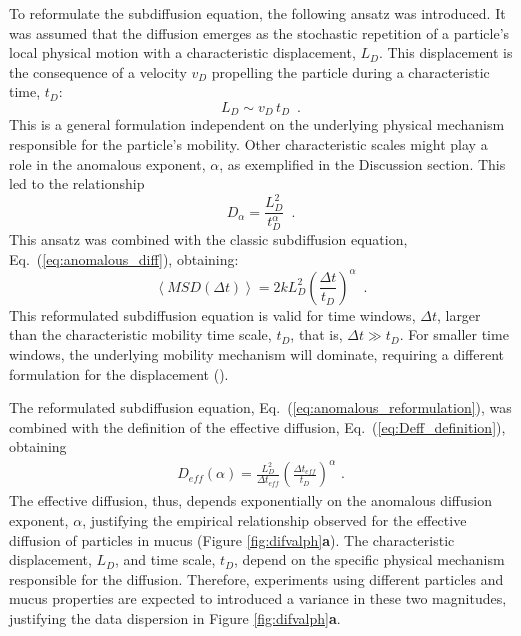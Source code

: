 \documentclass[aps,prl,preprint,superscriptaddress,showkeys,linenumbers]{revtex4-1}
\begin{document}
To reformulate the subdiffusion equation, the following ansatz was introduced. It was assumed that the diffusion emerges as the stochastic repetition of a particle's local physical motion with a characteristic displacement, $L_D$. This displacement is the consequence of a velocity $v_D$ propelling the particle during a characteristic time, $t_D$:
\begin{equation}
L_D \sim v_D \, t_D \,\,\,.
\label{eq:L_D_ansatz}
\end{equation}
This is a general formulation independent on the underlying physical mechanism responsible for the particle's mobility. Other characteristic scales might play a role in the anomalous exponent, $\alpha$, as exemplified in the Discussion section. This led to the relationship
\begin{equation}
D_{\alpha} = \frac{L_D^2}{t_D^\alpha} \,\,\, .
\label{eq:Dalpha_scaling}
\end{equation}
This ansatz was combined with the classic subdiffusion equation, Eq.~(\ref{eq:anomalous_diff}), obtaining:
\begin{equation}
\left\langle MSD(\Delta t ) \right\rangle = 2k  L_D^2 \left( \frac{\Delta t}{t_D}  \right)^{\alpha}  \,\,\, .
\label{eq:anomalous_reformulation}
\end{equation} 
This reformulated subdiffusion equation is valid for time windows, $\Delta t$, larger than the characteristic mobility time scale, $t_D$, that is, $\Delta t \gg t_D$. For smaller time windows, the underlying mobility mechanism will dominate, requiring a different formulation for the displacement (\cite{Kevin_2019}).

The reformulated subdiffusion equation, Eq.~(\ref{eq:anomalous_reformulation}), was combined with the definition of the effective diffusion, Eq.~(\ref{eq:Deff_definition}), obtaining
\begin{align}
   D_{eff}(\alpha) = \frac{L_D^2}{\Delta t_{eff}} \left( \frac{\Delta t_{eff}}{t_D} \right)^{\alpha}  \,\, .
  \label{eq:Deff_alpha} 
\end{align}
The effective diffusion, thus, depends exponentially on the anomalous diffusion exponent, $\alpha$, justifying the empirical relationship observed for the effective diffusion of particles in mucus (Figure \ref{fig:difvalph}\textbf{a}). The characteristic displacement, $L_D$, and time scale, $t_D$, depend on the specific physical mechanism responsible for the diffusion. Therefore, experiments using different particles and mucus properties are expected to introduced a variance in these two magnitudes, justifying the data dispersion in Figure \ref{fig:difvalph}\textbf{a}. 
\end{document}
